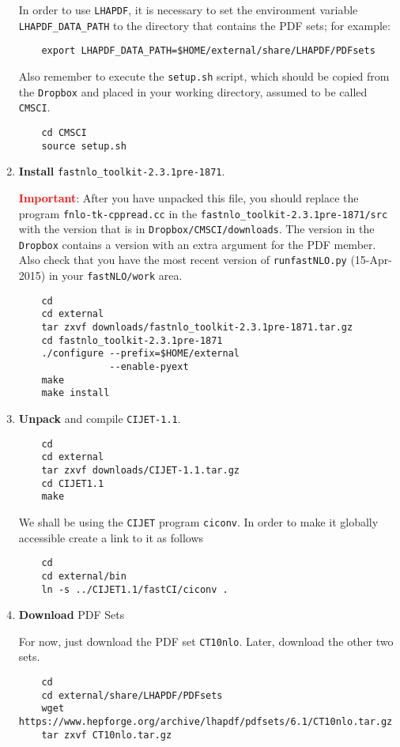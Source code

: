 \documentclass[aps,prd,preprint,nofootinbib]{revtex4}
\begin{document}
\begin{enumerate}
In order to use {\tt LHAPDF}, it is necessary to set the environment  variable
{\tt LHAPDF\_DATA\_PATH} to the directory that contains the PDF sets; for example:
\begin{verbatim}
	export LHAPDF_DATA_PATH=$HOME/external/share/LHAPDF/PDFsets
\end{verbatim}
Also remember to execute the {\tt setup.sh} script, which should be copied from the {\tt Dropbox} and placed in your working directory, assumed to be called {\tt CMSCI}. 
	\begin{verbatim}
	cd CMSCI
	source setup.sh
	\end{verbatim}
\item {\bf Install} {\tt fastnlo\_toolkit-2.3.1pre-1871}. 

	\textcolor{red}{{\bf Important}}: {After you have unpacked this file, you should replace the program
	{\tt fnlo-tk-cppread.cc} in the {\tt fastnlo\_toolkit-2.3.1pre-1871/src} with the version that
	is in {\tt Dropbox/CMSCI/downloads}. The version in the {\tt Dropbox} contains a version
	with an extra argument for the PDF member. Also check that you have the most recent version of {\tt runfastNLO.py} (15-Apr-2015) in your {\tt fastNLO/work} area.}
	\begin{verbatim}
	cd
	cd external 
	tar zxvf downloads/fastnlo_toolkit-2.3.1pre-1871.tar.gz
	cd fastnlo_toolkit-2.3.1pre-1871
	./configure --prefix=$HOME/external 
	            --enable-pyext
	make
	make install
	\end{verbatim}

\item {\bf Unpack} and compile {\tt CIJET-1.1}.
	\begin{verbatim}
	cd
	cd external
	tar zxvf downloads/CIJET-1.1.tar.gz
	cd CIJET1.1
	make
	\end{verbatim}
	We shall be using the {\tt CIJET} program {\tt ciconv}. In order to make it globally accessible 
	create a link to it as follows
	\begin{verbatim}
	cd
	cd external/bin
	ln -s ../CIJET1.1/fastCI/ciconv .
	\end{verbatim}
	
\item {\bf Download} PDF Sets

For  now, just download the PDF set {\tt CT10nlo}. Later, download the other two sets.
	\begin{verbatim}
	cd
	cd external/share/LHAPDF/PDFsets
	wget https://www.hepforge.org/archive/lhapdf/pdfsets/6.1/CT10nlo.tar.gz	
	tar zxvf CT10nlo.tar.gz
	\end{verbatim}


\end{enumerate}
\end{document}

